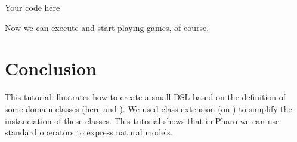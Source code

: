 \documentclass[a4paper,10pt,twoside]{book}
\begin{document}
\begin{code}{}
Your code here
\end{code}


Now we can execute  and start playing games, of course.
\section{ Conclusion}
This tutorial illustrates how to create a small DSL based on the definition of some domain classes (here  and
 ). We used class extension (on ) to simplify the instanciation of these classes.
This tutorial shows that in Pharo we can use standard operators to express natural models.



\ifx\wholebook\relax\else
   
\end{document}
